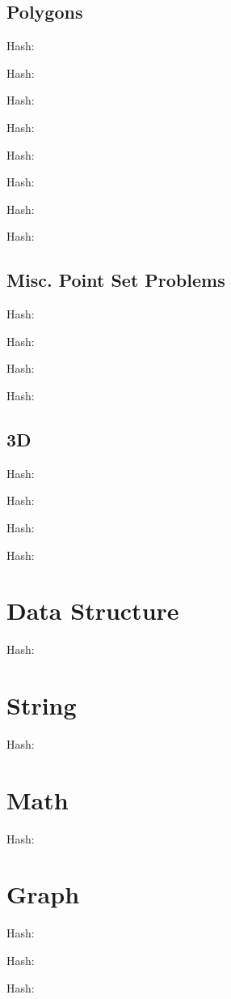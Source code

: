 \documentclass[10pt]{article}
\newcommand{\inputfile}[2]{
    Hash: \texttt{}
    
}
\begin{document}
\begin{multicols*}{3}
        \subsection{Polygons}
            \inputfile{../kactl/geometry/insidePolygon.h}{cpp}
            \inputfile{../kactl/geometry/PolygonArea.h}{cpp}
            \inputfile{../kactl/geometry/PolygonCenter.h}{cpp}
            \inputfile{../kactl/geometry/PolygonCut.h}{cpp}
            \inputfile{../kactl/geometry/ConvexHull.h}{cpp}
            \inputfile{../kactl/geometry/PolygonDiameter.h}{cpp}
            \inputfile{../kactl/geometry/PointInsideHull.h}{cpp}
            \inputfile{../kactl/geometry/LineHullIntersection.h}{cpp}

        \subsection{Misc. Point Set Problems}
            \inputfile{../kactl/geometry/closestPair.h}{cpp}
            \inputfile{../kactl/geometry/kdTree.h}{cpp}
            \inputfile{../kactl/geometry/DelaunayTriangulation.h}{cpp}
            \inputfile{../kactl/geometry/FastDelaunay.h}{cpp}

        \subsection{3D}
            \inputfile{../kactl/geometry/PolyhedronVolume.h}{cpp}
            \inputfile{../kactl/geometry/Point3D.h}{cpp}
            \inputfile{../kactl/geometry/3dHull.h}{cpp}
            \inputfile{../kactl/geometry/sphericalDistance.h}{cpp}

	
	\section{Data Structure}
	\inputfile{data_structure_LCT.cpp}{cpp}
	
	\section{String}
	\inputfile{string_SAM.cpp}{cpp}
	
	\section{Math}
	\inputfile{math_simplex.cpp}{cpp}
	
	\section{Graph}
	\inputfile{graph_clique.cpp}{cpp}
	\inputfile{directed_MST.cpp}{cpp}
	\inputfile{graph_dominator_tree.cpp}{cpp}

\end{multicols*}
\end{document}
